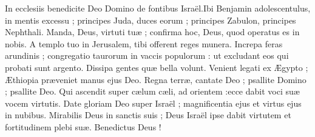 {\VERSE In ecclesiis benedicite Deo Domino de fontibus Israël.\VERSE Ibi Benjamin adolescentulus,  in mentis excessu ; principes Juda,  duces eorum ; 
principes Zabulon,  principes Nephthali. \EVERSE
\VERSE Manda,  Deus,  virtuti tuæ ; confirma hoc,  Deus,  quod operatus es in nobis. \EVERSE
\VERSE A templo tuo in Jerusalem, tibi offerent reges munera. \EVERSE
\VERSE Increpa feras arundinis ; congregatio taurorum in vaccis populorum :
ut excludant eos qui probati sunt argento.
Dissipa gentes quæ bella volunt. \EVERSE
\VERSE Venient legati ex Ægypto ; Æthiopia præveniet manus ejus Deo. \EVERSE
\VERSE Regna terræ,  cantate Deo ; psallite Domino ;  psallite Deo. \EVERSE
\VERSE Qui ascendit super cælum cæli,  ad orientem :ecce dabit voci suæ vocem virtutis. \EVERSE
\VERSE Date gloriam Deo super Israël ; magnificentia ejus et virtus ejus in nubibus. \EVERSE
\VERSE Mirabilis Deus in sanctis suis ; Deus Israël ipse dabit virtutem et fortitudinem plebi suæ.
Benedictus Deus !

}
